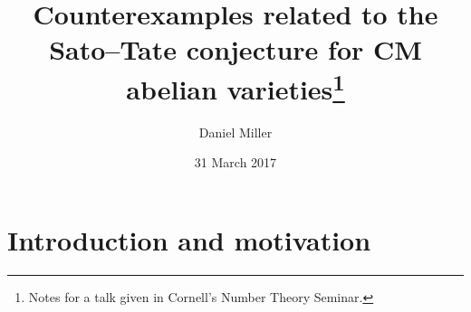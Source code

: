 \documentclass{article}
\title{Counterexamples related to the Sato--Tate conjecture for CM abelian 
varieties\thanks{Notes for a talk given in Cornell's Number Theory 
Seminar.}}
\author{Daniel Miller}
\date{31 March 2017}
\begin{document}
\maketitle





\section{Introduction and motivation}


\end{document}
